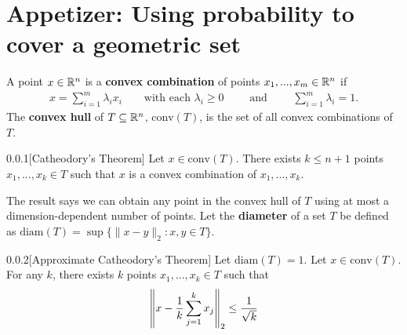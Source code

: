 

\section{Appetizer: Using probability to cover a geometric set}

A point $x \in \mathbb{R}^n$ is a \textbf{convex combination} of points $x_1,..., x_m \in \mathbb{R}^n$ if 
\begin{align*}
x = \sum_{i=1}^m \lambda_i x_i \qquad\text{with each } \lambda_i\geq0 \qquad\text{ and }\qquad \sum_{i=1}^m \lambda_i = 1.
\end{align*}
The \textbf{convex hull} of $T \subseteq \mathbb{R}^n$, $\text{conv}(T)$, is the set of all convex combinations of $T$.

\begin{thm}{0.0.1}[Catheodory's Theorem]\label{0.0.1}
Let $x \in \text{conv}(T)$. There exists $k \leq n+1$ points $x_1,...,x_k \in T$ such that $x$ is a convex combination of $x_1,...,x_k$.
\end{thm} 

The result says we can obtain any point in the convex hull of $T$ using at most a dimension-dependent number of points. Let the {\bf diameter} of a set $T$ be defined as $\text{diam}(T) = \sup \{\|x-y\|_2 : x,y \in T\}$.


\begin{thm}{0.0.2}[Approximate Catheodory's Theorem]\label{0.0.2}
Let $\text{diam}(T) = 1$. Let $x \in \text{conv}(T)$. For any $k$, there exists $k$ points $x_1,...,x_k \in T$ such that
\begin{align*}
    \left\| x - \frac 1 k \sum_{j=1}^k x_j\right\|_2 \leq \frac 1 {\sqrt k}
\end{align*}
\end{thm}

